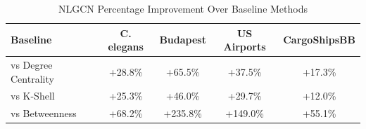 \begin{table}[h]
\centering
\caption{NLGCN Percentage Improvement Over Baseline Methods}
\label{tab:improvement}
\begin{tabular}{|l|c|c|c|c|}
\hline
\textbf{Baseline} & \textbf{C. elegans} & \textbf{Budapest} &
\textbf{US Airports} & \textbf{CargoShipsBB} \\
\hline
vs Degree Centrality   & +28.8\% & +65.5\% & +37.5\% & +17.3\% \\
vs K-Shell             & +25.3\% & +46.0\% & +29.7\% & +12.0\% \\
vs Betweenness         & +68.2\% & +235.8\% & +149.0\% & +55.1\% \\
\hline
\end{tabular}
\end{table}


